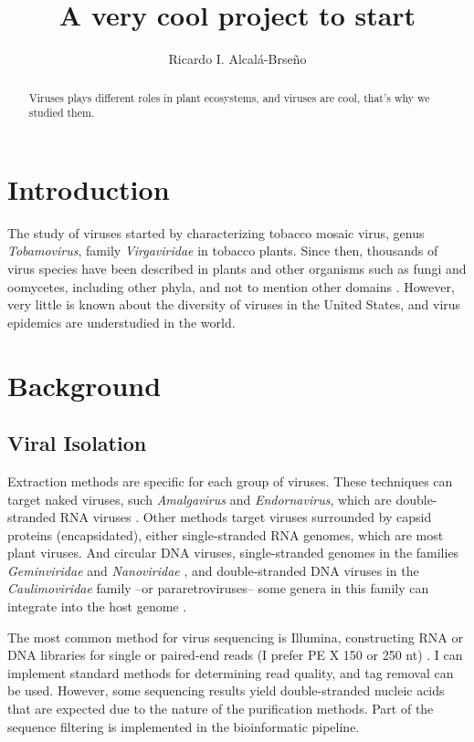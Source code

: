 \documentclass[11pt]{article}
\title{A very cool project to start}
\author{Ricardo I. Alcal\'a-Brse\~no}
\date{}
\begin{document}
\maketitle

\begin{abstract}
Viruses plays different roles in plant ecosystems, and viruses are cool, that's why we studied them.   
\end{abstract}

\section{Introduction}\label{section-introduction}
	
The study of viruses started by characterizing tobacco mosaic virus, genus {\it Tobamovirus}, family {\it Virgaviridae} in tobacco plants. Since then, thousands of virus species have been described in plants and other organisms such as fungi and oomycetes, including other phyla, and not to mention other domains \cite{roossinck_viruses_2019, dolja_deep_2020}. 
However, very little is known about the diversity of viruses in the United States, and virus epidemics are understudied in the world.

\section{Background}
\subsection{Viral Isolation}
Extraction methods are specific for each group of viruses. These techniques can target naked viruses, such {\it Amalgavirus} and {\it Endornavirus}, which are double-stranded RNA viruses \cite{alcala2017genome, alcala2018novel}. Other methods target viruses surrounded by capsid proteins (encapsidated), either single-stranded RNA genomes, which are most plant viruses. And circular DNA viruses, single-stranded genomes in the families {\it Geminviridae} and {\it Nanoviridae} \cite{boukari2017occurrence}, and double-stranded DNA viruses in the {\it Caulimoviridae} family –or pararetroviruses– some genera in this family can integrate into the host genome \cite{saad2020blueberry}. 

The most common method for virus sequencing is Illumina, constructing RNA or DNA libraries for single or paired-end reads (I prefer PE X 150 or 250 nt) \cite{alcala2017genome, alcala2018novel, alcala2020network}. I can implement standard methods for determining read quality, and tag removal can be used. However, some sequencing results yield double-stranded nucleic acids that are expected due to the nature of the purification methods. Part of the sequence filtering is implemented in the bioinformatic pipeline.
\end{document}
